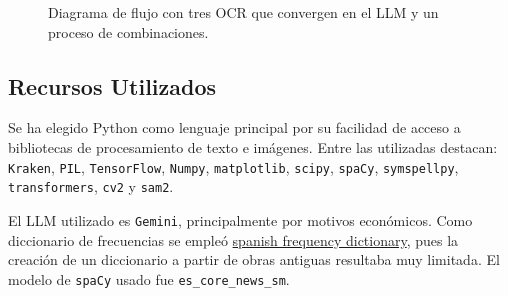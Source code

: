 \documentclass[11pt,a4paper]{article}
\begin{document}
\begin{figure}[h!]
    \centering
    \caption{Diagrama de flujo con tres OCR que convergen en el LLM y un proceso de combinaciones.}
    \label{fig:workflow}
\end{figure}

\subsection{Recursos Utilizados}

Se ha elegido Python como lenguaje principal por su facilidad de acceso a bibliotecas de procesamiento de texto e imágenes. Entre las utilizadas destacan: \texttt{Kraken}, \texttt{PIL}, \texttt{TensorFlow}, \texttt{Numpy}, \texttt{matplotlib}, \texttt{scipy}, \texttt{spaCy}, \texttt{symspellpy}, \texttt{transformers}, \texttt{cv2} y \texttt{sam2}.

El LLM utilizado es \texttt{Gemini}, principalmente por motivos económicos. Como diccionario de frecuencias se empleó \href{https://github.com/hermitdave/FrequencyWords/blob/master/content/2016/es/es_full.txt}{spanish frequency dictionary}, pues la creación de un diccionario a partir de obras antiguas resultaba muy limitada. El modelo de \texttt{spaCy} usado fue \texttt{es\_core\_news\_sm}.
\end{document}
